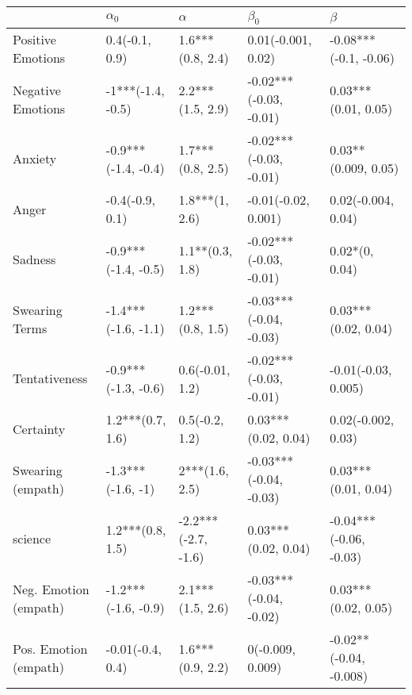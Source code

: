 \begin{tabular}{lllll}
\toprule
{} &           $\alpha_0$ &             $\alpha$ &               $\beta_0$ &                 $\beta$ \\
\midrule
Positive Emotions     &       0.4(-0.1, 0.9) &     1.6***(0.8, 2.4) &      0.01(-0.001, 0.02) &   -0.08***(-0.1, -0.06) \\
Negative Emotions     &    -1***(-1.4, -0.5) &     2.2***(1.5, 2.9) &  -0.02***(-0.03, -0.01) &     0.03***(0.01, 0.05) \\
Anxiety               &  -0.9***(-1.4, -0.4) &     1.7***(0.8, 2.5) &  -0.02***(-0.03, -0.01) &     0.03**(0.009, 0.05) \\
Anger                 &      -0.4(-0.9, 0.1) &       1.8***(1, 2.6) &     -0.01(-0.02, 0.001) &      0.02(-0.004, 0.04) \\
Sadness               &  -0.9***(-1.4, -0.5) &      1.1**(0.3, 1.8) &  -0.02***(-0.03, -0.01) &          0.02*(0, 0.04) \\
Swearing Terms        &  -1.4***(-1.6, -1.1) &     1.2***(0.8, 1.5) &  -0.03***(-0.04, -0.03) &     0.03***(0.02, 0.04) \\
Tentativeness         &  -0.9***(-1.3, -0.6) &      0.6(-0.01, 1.2) &  -0.02***(-0.03, -0.01) &     -0.01(-0.03, 0.005) \\
Certainty             &     1.2***(0.7, 1.6) &       0.5(-0.2, 1.2) &     0.03***(0.02, 0.04) &      0.02(-0.002, 0.03) \\
Swearing (empath)     &    -1.3***(-1.6, -1) &       2***(1.6, 2.5) &  -0.03***(-0.04, -0.03) &     0.03***(0.01, 0.04) \\
science               &     1.2***(0.8, 1.5) &  -2.2***(-2.7, -1.6) &     0.03***(0.02, 0.04) &  -0.04***(-0.06, -0.03) \\
Neg. Emotion (empath) &  -1.2***(-1.6, -0.9) &     2.1***(1.5, 2.6) &  -0.03***(-0.04, -0.02) &     0.03***(0.02, 0.05) \\
Pos. Emotion (empath) &     -0.01(-0.4, 0.4) &     1.6***(0.9, 2.2) &        0(-0.009, 0.009) &  -0.02**(-0.04, -0.008) \\
\bottomrule
\end{tabular}
